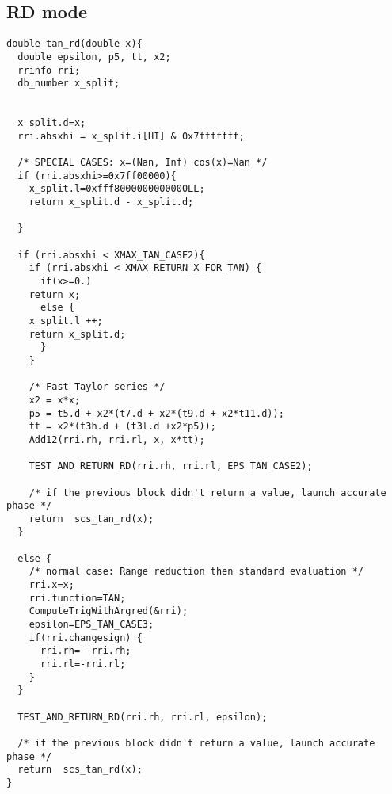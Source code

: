 \subsection{RD mode}
\begin{lstlisting}[caption={Exceptional cases for tangent RD},firstnumber=1]
double tan_rd(double x){
  double epsilon, p5, tt, x2;
  rrinfo rri;
  db_number x_split;


  x_split.d=x;
  rri.absxhi = x_split.i[HI] & 0x7fffffff;

  /* SPECIAL CASES: x=(Nan, Inf) cos(x)=Nan */
  if (rri.absxhi>=0x7ff00000){
    x_split.l=0xfff8000000000000LL;
    return x_split.d - x_split.d;

  }

  if (rri.absxhi < XMAX_TAN_CASE2){
    if (rri.absxhi < XMAX_RETURN_X_FOR_TAN) {
      if(x>=0.)
	return x;
      else {
	x_split.l ++;
	return x_split.d;
      }
    }

    /* Fast Taylor series */
    x2 = x*x;
    p5 = t5.d + x2*(t7.d + x2*(t9.d + x2*t11.d));
    tt = x2*(t3h.d + (t3l.d +x2*p5));
    Add12(rri.rh, rri.rl, x, x*tt);

    TEST_AND_RETURN_RD(rri.rh, rri.rl, EPS_TAN_CASE2);

    /* if the previous block didn't return a value, launch accurate phase */
    return  scs_tan_rd(x);
  }

  else {
    /* normal case: Range reduction then standard evaluation */
    rri.x=x;
    rri.function=TAN;
    ComputeTrigWithArgred(&rri);
    epsilon=EPS_TAN_CASE3;
    if(rri.changesign) {
      rri.rh= -rri.rh;
      rri.rl=-rri.rl;
    }
  }

  TEST_AND_RETURN_RD(rri.rh, rri.rl, epsilon);

  /* if the previous block didn't return a value, launch accurate phase */
  return  scs_tan_rd(x);
}
\end{lstlisting}

